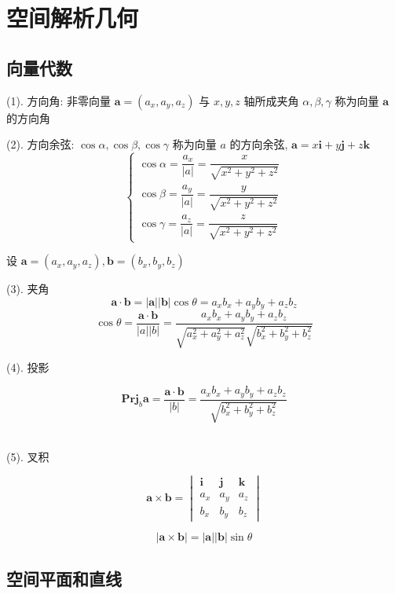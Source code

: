 \chapter{空间解析几何}
\section{向量代数}
\begin{definition}[向量代数]
	(1). 方向角: 非零向量 $\boldsymbol{a} = (a_{x},a_{y},a_{z})$ 与 $x,y,z$ 轴所成夹角 $\alpha,\beta,\gamma$ 称为向量 $\boldsymbol{a}$ 的方向角 
	
	(2). 方向余弦: $\cos \alpha,\cos \beta,\cos\gamma$ 称为向量 $a$ 的方向余弦, $\boldsymbol{a} = x\boldsymbol{i} + y\boldsymbol{j} + z\boldsymbol{k}$
	$$\begin{cases}
		\cos \alpha=\dfrac{a_{x}}{|a|} = \dfrac{x}{\sqrt{x^{2}+y^{2}+z^{2}}}\\
		\cos \beta=\dfrac{a_{y}}{|a|} = \dfrac{y}{\sqrt{x^{2}+y^{2}+z^{2}}}\\
		\cos \gamma=\dfrac{a_{z}}{|a|} = \dfrac{z}{\sqrt{x^{2}+y^{2}+z^{2}}}
	\end{cases}$$

	设 $\boldsymbol{a} = (a_{x},a_{y},a_{z}), \boldsymbol{b} = (b_{x},b_{y},b_{z})$

	(3). 夹角
	$$\boldsymbol{a}\cdot \boldsymbol{b} = |\boldsymbol{a}||\boldsymbol{b}|\cos \theta = a_{x}b_{x}+a_{y}b_{y}+a_{z}b_{z}$$
	$$\cos \theta = \dfrac{\boldsymbol{a}\cdot \boldsymbol{b}}{|a||b|} = \dfrac{a_{x}b_{x}+a_{y}b_{y}+a_{z}b_{z}}{\sqrt{a_{x}^2+a_{y}^2+a_{z}^2}\sqrt{b_{x}^2+b_{y}^2+b_{z}^2}}$$
	
	(4). 投影

	$$\textbf{Prj}_{b}\boldsymbol{a}=\dfrac{\boldsymbol{a}\cdot \boldsymbol{b}}{|b|}=\dfrac{a_{x}b_{x}+a_{y}b_{y}+a_{z}b_{z}}{\sqrt{b_{x}^2+b_{y}^2+b_{z}^2}}$$\

	(5). 叉积

	$$\boldsymbol{a}\times \boldsymbol{b} = \begin{vmatrix}
		\boldsymbol{i} & \boldsymbol{j} & \boldsymbol{k} \\
		a_{x} & a_{y} & a_{z} \\
		b_{x} & b_{y} & b_{z}
	\end{vmatrix}$$
	
	$$|\boldsymbol{a}\times \boldsymbol{b}| = |\boldsymbol{a}||\boldsymbol{b}|\sin\theta$$
\end{definition}

\section{空间平面和直线}

